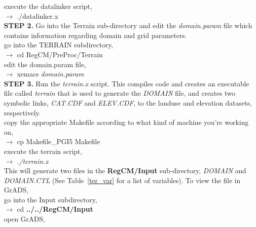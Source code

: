 \noindent
execute the datalinker script, \\

\indent
$\rightarrow$ ./datalinker.x \\

\noindent
{\bf STEP 2.}  Go into the Terrain sub-directory and edit the {\it domain.param} file which contains
information regarding domain and grid parameters.  \\ 

\noindent
go into the TERRAIN subdirectory, \\

\indent 
$\rightarrow$ cd RegCM/PreProc/Terrain \\ 

\noindent
edit the domain.param file, \\

\indent 
$\rightarrow$ xemacs {\it domain.param} \\


\noindent
{\bf STEP 3.}  Run the {\it terrain.x} script.  This compiles code and 
creates an executable file called {\it terrain} that is used to generate the {\it DOMAIN} 
file, and creates two symbolic links, {\it CAT.CDF} and {\it ELEV.CDF}, 
to the landuse and elevation datasets, respectively.  \\

\noindent
copy the appropriate Makefile according to what kind of machine you're working on, \\

\indent 
$\rightarrow$   {cp Makefile\_PGI5 Makefile} \\

\noindent
execute the terrain script, \\

\indent 
$\rightarrow$   {\it ./terrain.x} \\


\noindent
This will generate two files in the {\bf RegCM/Input} sub-directory, {\it DOMAIN} and 
{\it DOMAIN.CTL} (See Table~\ref{ter_var} for a list of variables). To view the file in GrADS, \\

\noindent
go into the Input subdirectory, \\

\indent
$\rightarrow$   cd {\bf ../../RegCM/Input} \\ 

\noindent
open GrADS, \\

